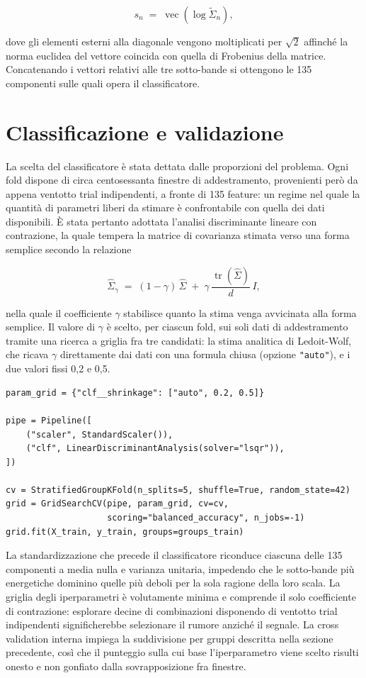 \[
s_n \;=\; \operatorname{vec}\!\left( \log \tilde{\Sigma}_n \right) ,
\]

dove gli elementi esterni alla diagonale vengono moltiplicati per $\sqrt{2}$ affinché la norma euclidea del vettore coincida con quella di Frobenius della matrice. Concatenando i vettori relativi alle tre sotto-bande si ottengono le 135 componenti sulle quali opera il classificatore.

\section{Classificazione e validazione}
La scelta del classificatore è stata dettata dalle proporzioni del problema. Ogni fold dispone di circa centosessanta finestre di addestramento, provenienti però da appena ventotto trial indipendenti, a fronte di 135 feature: un regime nel quale la quantità di parametri liberi da stimare è confrontabile con quella dei dati disponibili. È stata pertanto adottata l’analisi discriminante lineare con contrazione, la quale tempera la matrice di covarianza stimata verso una forma semplice secondo la relazione

\[
\hat{\Sigma}_\gamma \;=\; (1-\gamma)\,\hat{\Sigma} \;+\; \gamma\, \frac{\operatorname{tr}(\hat{\Sigma})}{d}\, I ,
\]

nella quale il coefficiente $\gamma$ stabilisce quanto la stima venga avvicinata alla forma semplice. Il valore di $\gamma$ è scelto, per ciascun fold, sui soli dati di addestramento tramite una ricerca a griglia fra tre candidati: la stima analitica di Ledoit-Wolf, che ricava $\gamma$ direttamente dai dati con una formula chiusa (opzione \texttt{"auto"}), e i due valori fissi 0,2 e 0,5.

\begin{lstlisting}
param_grid = {"clf__shrinkage": ["auto", 0.2, 0.5]}

pipe = Pipeline([
    ("scaler", StandardScaler()),
    ("clf", LinearDiscriminantAnalysis(solver="lsqr")),
])

cv = StratifiedGroupKFold(n_splits=5, shuffle=True, random_state=42)
grid = GridSearchCV(pipe, param_grid, cv=cv,
                    scoring="balanced_accuracy", n_jobs=-1)
grid.fit(X_train, y_train, groups=groups_train)
\end{lstlisting}

La standardizzazione che precede il classificatore riconduce ciascuna delle 135 componenti a media nulla e varianza unitaria, impedendo che le sotto-bande più energetiche dominino quelle più deboli per la sola ragione della loro scala. La griglia degli iperparametri è volutamente minima e comprende il solo coefficiente di contrazione: esplorare decine di combinazioni disponendo di ventotto trial indipendenti significherebbe selezionare il rumore anziché il segnale. La cross validation interna impiega la suddivisione per gruppi descritta nella sezione precedente, così che il punteggio sulla cui base l’iperparametro viene scelto risulti onesto e non gonfiato dalla sovrapposizione fra finestre.

